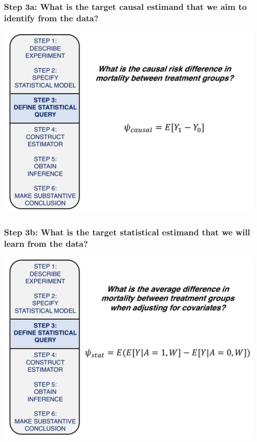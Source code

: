 \documentclass[t]{beamer}
\begin{document}
\begin{frame}
  \frametitle{Step 3a: What is the target causal estimand that we aim to identify from the data?}
  \vspace{-20pt}
  \begin{center}
  \includegraphics[width = 1.05\textwidth]{figures/roadmap3_1.pdf}
  \end{center}
\end{frame}

\begin{frame}
  \frametitle{Step 3b: What is the target statistical estimand that we will learn from the data?}
  \vspace{-20pt}
  \begin{center}
  \includegraphics[width = 1.05\textwidth]{figures/roadmap3_2.pdf}
  \end{center}
\end{frame}
\end{document}
